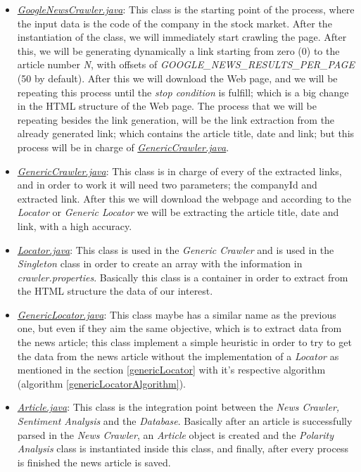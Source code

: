 \begin{itemize}
	\item \emph{\ul{GoogleNewsCrawler.java}}: This class is the starting point of the process, where the input data is the code of the company in the stock market. After the instantiation of the class, we will immediately start crawling the page. After this, we will be generating dynamically a link starting from zero (0) to the article number \emph{N}, with offsets of \emph{GOOGLE\_NEWS\_RESULTS\_PER\_PAGE} (50 by default). After this we will download the Web page, and we will be repeating this process until the \emph{stop condition} is fulfill; which is a big change in the HTML structure of the Web page. The process that we will be repeating besides the link generation, will be the link extraction from the already generated link; which contains the article title, date and link; but this process will be in charge of \emph{\ul{GenericCrawler.java}}.
	\item \emph{\ul{GenericCrawler.java}}: This class is in charge of every of the extracted links, and in order to work it will need two parameters; the companyId and extracted link. After this we will download the webpage and according to the \emph{Locator} or \emph{Generic Locator} we will be extracting the article title, date and link, with a high accuracy.	
	\item \emph{\ul{Locator.java}}: This class is used in the \emph{Generic Crawler} and is used in the \emph{Singleton} class in order to create an array with the information in \emph{crawler.properties}. Basically this class is a container in order to extract from the HTML structure the data of our interest.
	\item \emph{\ul{GenericLocator.java}}: This class maybe has a similar name as the previous one, but even if they aim the same objective, which is to extract data from the news article; this class implement a simple heuristic in order to try to get the data from the news article without the implementation of a \emph{Locator} as mentioned in the section \ref{genericLocator} with it's respective algorithm (algorithm \ref{genericLocatorAlgorithm}).
	\item \emph{\ul{Article.java}}: This class is the integration point between the \emph{News Crawler, Sentiment Analysis} and the  \emph{Database}. Basically after an article is successfully parsed in the \emph{News Crawler}, an \emph{Article} object is created and the \emph{Polarity Analysis} class is instantiated inside this class, and finally, after every process is finished the news article is saved. 
\end{itemize}

